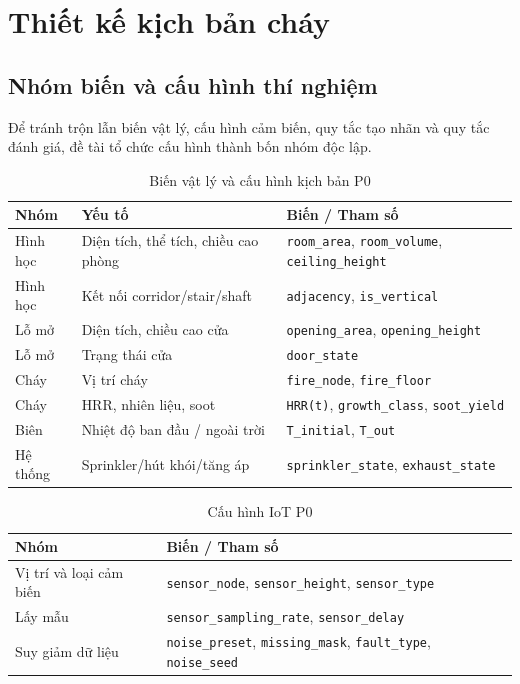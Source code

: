 \section{Thiết kế kịch bản cháy}
\label{sec:kichban}

\subsection{Nhóm biến và cấu hình thí nghiệm}

Để tránh trộn lẫn biến vật lý, cấu hình cảm biến, quy tắc tạo nhãn và quy tắc đánh giá, đề tài tổ chức cấu hình thành bốn nhóm độc lập.

\begin{table}[H]
\centering
\caption{Biến vật lý và cấu hình kịch bản P0}
\label{tab:factorPhysical}
\begin{tabularx}{\textwidth}{l l X}
\toprule
\textbf{Nhóm} & \textbf{Yếu tố} & \textbf{Biến / Tham số} \\
\midrule
Hình học  & Diện tích, thể tích, chiều cao phòng & \texttt{room\_area}, \texttt{room\_volume}, \texttt{ceiling\_height} \\
Hình học  & Kết nối corridor/stair/shaft          & \texttt{adjacency}, \texttt{is\_vertical} \\
Lỗ mở     & Diện tích, chiều cao cửa              & \texttt{opening\_area}, \texttt{opening\_height} \\
Lỗ mở     & Trạng thái cửa                        & \texttt{door\_state} \\
Cháy      & Vị trí cháy                           & \texttt{fire\_node}, \texttt{fire\_floor} \\
Cháy      & HRR, nhiên liệu, soot                 & \texttt{HRR(t)}, \texttt{growth\_class}, \texttt{soot\_yield} \\
Biên      & Nhiệt độ ban đầu / ngoài trời         & \texttt{T\_initial}, \texttt{T\_out} \\
Hệ thống  & Sprinkler/hút khói/tăng áp             & \texttt{sprinkler\_state}, \texttt{exhaust\_state} \\
\bottomrule
\end{tabularx}
\end{table}

\begin{table}[H]
\centering
\caption{Cấu hình IoT P0}
\label{tab:factorIoT}
\begin{tabularx}{\textwidth}{l X}
\toprule
\textbf{Nhóm} & \textbf{Biến / Tham số} \\
\midrule
Vị trí và loại cảm biến & \texttt{sensor\_node}, \texttt{sensor\_height}, \texttt{sensor\_type} \\
Lấy mẫu & \texttt{sensor\_sampling\_rate}, \texttt{sensor\_delay} \\
Suy giảm dữ liệu & \texttt{noise\_preset}, \texttt{missing\_mask}, \texttt{fault\_type}, \texttt{noise\_seed} \\
\bottomrule
\end{tabularx}
\end{table}


